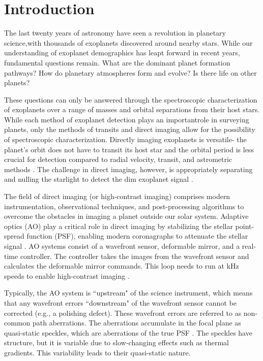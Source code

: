\section{Introduction} \label{sec:intro}

The last twenty years of astronomy have seen a revolution in planetary science,with thousands of exoplanets discovered around nearby stars. While our understanding of exoplanet demographics has leapt forward in recent years, fundamental questions remain. What are the dominant planet formation pathways? How do planetary atmospheres form and evolve? Is there life on other planets?

These questions can only be answered through the spectroscopic characterization of exoplanets over a range of masses and orbital separations from their host stars. While each method of exoplanet detection plays an importantrole in surveying planets, only the methods of transits and direct imaging allow for the possibility of spectroscopic characterization. Directly imaging exoplanets is versatile- the planet's orbit does not have to transit its host star and the orbital period is less crucial for detection compared to radial velocity, transit, and astrometric methods \citep{2013pss3.book..489W}. The challenge in direct imaging, however, is appropriately separating and nulling the starlight to detect the dim exoplanet signal \citep{2010exop.book..111T}.

The field of direct imaging (or high-contrast imaging) comprises modern instrumentation, observational techniques, and post-processing algorithms to overcome the obstacles in imaging a planet outside our solar system. Adaptive optics (AO) play a critical role in direct imaging by stabilizing the stellar point-spread function (PSF), enabling modern coronagraphs to attenuate the stellar signal \citep{2005ApJ...629..592G}. AO systems consist of a wavefront sensor, deformable mirror, and a real-time controller. The controller takes the images from the wavefront sensor and calculates the deformable mirror commands. This loop needs to run at kHz speeds to enable high-contrast imaging \citep{2018ARA&A..56..315G}.

Typically, the AO system is ``upstream" of the science instrument, which means that any wavefront errors ``downstream" of the wavefront sensor cannot be corrected (e.g., a polishing defect). These wavefront errors are referred to as non-common path aberrations. The aberrations accumulate in the focal plane as quasi-static speckles, which are aberrations of the true PSF \citep{2018ARA&A..56..315G}. The speckles have structure, but it is variable due to slow-changing effects such as thermal gradients. This variability leads to their quasi-static nature.

